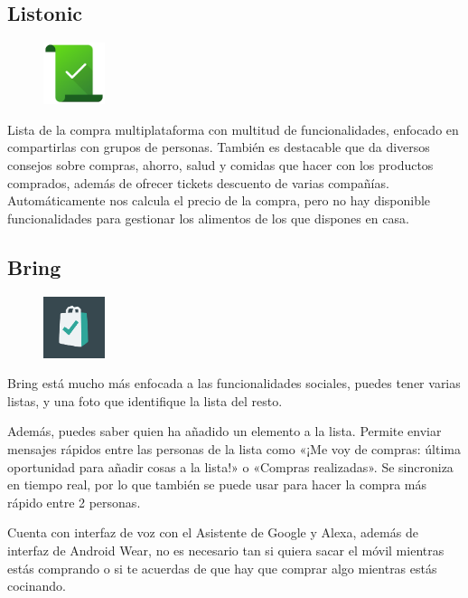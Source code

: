\subsection{Listonic}
\begin{figure}
\vspace{-.5cm}
\includegraphics[width=1.8cm]{images/listonic.png}
\end{figure}
Lista de la compra multiplataforma con multitud de funcionalidades, enfocado en compartirlas con grupos de personas. También es destacable que da diversos consejos sobre compras, ahorro, salud y comidas que hacer con los productos comprados, además de ofrecer tickets descuento de varias compañías. Automáticamente nos calcula el precio de la compra, pero no hay disponible funcionalidades para gestionar los alimentos de los que dispones en casa.

\subsection{Bring}
\begin{figure}
\vspace{-.5cm}
\includegraphics[width=1.8cm]{images/bring.png}
\end{figure}
Bring está mucho más enfocada a las funcionalidades sociales, puedes tener varias listas, y una foto que identifique la lista del resto. 

Además, puedes saber quien ha añadido un elemento a la lista. Permite enviar mensajes rápidos entre las personas de la lista como «¡Me voy de compras: última oportunidad para añadir cosas a la lista!» o «Compras realizadas». Se sincroniza en tiempo real, por lo que también se puede usar para hacer la compra más rápido entre 2 personas. 

Cuenta con interfaz de voz con el Asistente de Google y Alexa, además de interfaz de Android Wear, no es necesario tan si quiera sacar el móvil mientras estás comprando o si te acuerdas de que hay que comprar algo mientras estás cocinando. 

